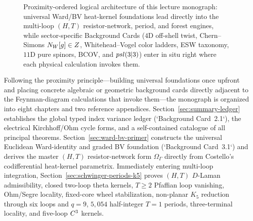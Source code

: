 \begin{figure}[H]
\caption{Proximity-ordered logical architecture of this lecture monograph: universal Ward/BV heat-kernel foundations lead directly into the multi-loop $(H,T)$ resistor-network, period, and forest engines, while sector-specific Background Cards ($4\mathrm{D}$ off-shell twist, Chern--Simons $N_W[g]\in Z$, Whitehead--Vogel color ladders, ESW taxonomy, $11\mathrm{D}$ pure spinors, BCOV, and $psl(3|3)$) enter in situ right where each physical calculation invokes them.}
\label{fig:overview}
\end{figure}

Following the proximity principle---building universal foundations once upfront and placing concrete algebraic or geometric background cards directly adjacent to the Feynman-diagram calculations that invoke them---the monograph is organized into eight chapters and two reference appendices. Section~\ref{sec:summary-ledger} establishes the global typed index variance ledger (`Background Card~2.1`), the electrical Kirchhoff/Ohm cycle forms, and a self-contained catalogue of all principal theorems. Section~\ref{sec:ward-bv-primer} constructs the universal Euclidean Ward-identity and graded BV foundation (`Background Card~3.1`) and derives the master $(H,T)$ resistor-network form $\Omega_\Gamma$ directly from Costello's codifferential heat-kernel parametrix. Immediately entering multi-loop integration, Section~\ref{sec:schwinger-periods-k5} proves $(H,T)$ $D$-Laman admissibility, closed two-loop theta kernels, $T\ge 2$ Pfaffian loop vanishing, Ohm/Segre locality, fixed-core wheel stabilization, non-planar $K_5$ reduction through six loops and $q=9$, $5{,}054$ half-integer $T=1$ periods, three-terminal locality, and five-loop $C^3$ kernels.

